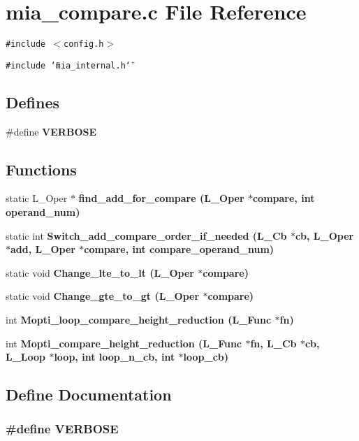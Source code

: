 \section{mia\_\-compare.c File Reference}
\label{mia__compare_8c}
{\tt \#include $<$config.h$>$}\par
{\tt \#include \char`\"{}mia\_\-internal.h\char`\"{}}\par
\subsection*{Defines}
\begin{CompactItemize}
\item 
\#define \bf{VERBOSE}
\end{CompactItemize}
\subsection*{Functions}
\begin{CompactItemize}
\item 
static L\_\-Oper $\ast$ \bf{find\_\-add\_\-for\_\-compare} (L\_\-Oper $\ast$compare, int operand\_\-num)
\item 
static int \bf{Switch\_\-add\_\-compare\_\-order\_\-if\_\-needed} (L\_\-Cb $\ast$cb, L\_\-Oper $\ast$add, L\_\-Oper $\ast$compare, int compare\_\-operand\_\-num)
\item 
static void \bf{Change\_\-lte\_\-to\_\-lt} (L\_\-Oper $\ast$compare)
\item 
static void \bf{Change\_\-gte\_\-to\_\-gt} (L\_\-Oper $\ast$compare)
\item 
int \bf{Mopti\_\-loop\_\-compare\_\-height\_\-reduction} (L\_\-Func $\ast$fn)
\item 
int \bf{Mopti\_\-compare\_\-height\_\-reduction} (L\_\-Func $\ast$fn, L\_\-Cb $\ast$cb, L\_\-Loop $\ast$loop, int loop\_\-n\_\-cb, int $\ast$\bf{loop\_\-cb})
\end{CompactItemize}


\subsection{Define Documentation}
\subsubsection{\setlength{\rightskip}{0pt plus 5cm}\#define VERBOSE}\label{mia__compare_8c_42f8c497a1968074f38bf5055c650dca}





